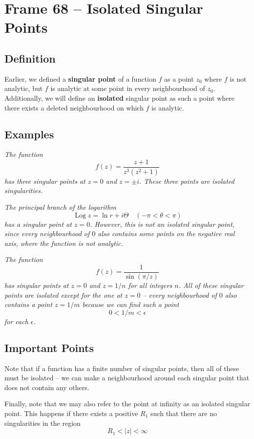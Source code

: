 \documentclass{article}
\renewcommand{\emph}{\textbf}
\DeclareMathOperator{\Log}{Log}
\begin{document}
\section{Frame 68 -- Isolated Singular Points}
\subsection{Definition}
Earlier, we defined a \emph{singular point} of a function $f$ as a point $z_0$ where $f$ is not analytic, but $f$ is analytic at some point in every neighbourhood of $z_0$. Additionally, we will define an \emph{isolated} singular point as such a point where there exists a deleted neighbourhood on which $f$ is analytic.

\subsection{Examples}
\textit{The function
\[
	f(z) = \frac{z+1}{z^3 (z^2 + 1)}
\]
has three singular points at $z = 0$ and $z = \pm i$. These three points are isolated singularities.}

\textit{The principal branch of the logarithm
\[
	\Log z = \ln r + i\Theta 	\quad (-\pi < \theta < \pi)
\]
has a singular point at $z = 0$. However, this is not an isolated singular point, since every neighbourhood of $0$ also contains some points on the negative real axis, where the function is not analytic.}

\textit{The function
\[
	f(z) = \frac{1}{\sin(\pi / z)}
\]
has singular points at $z = 0$ and $z = 1/n$ for all integers $n$. All of these singular points are isolated except for the one at $z = 0$ -- every neighbourhood of $0$ also contains a point $z = 1/m$ because we can find such a point
\[
	0 < 1/m < \epsilon
\]
for each $\epsilon$.}

\subsection{Important Points}
Note that if a function has a finite number of singular points, then all of these must be isolated -- we can make a neighbourhood around each singular point that does not contain any others.

Finally, note that we may also refer to the point at infinity as an isolated singular point. This happens if there exists a positive $R_1$ such that there are no singularities in the region
\[
	R_1 < |z| < \infty
\]
\end{document}
